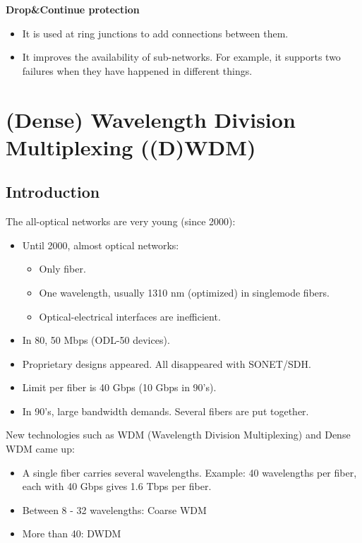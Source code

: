 \documentclass[../main.tex]{subfiles}
\begin{document}
\textbf{Drop\&Continue protection}
\begin{itemize}
	\item It is used at ring junctions to add connections between them.
	\item It improves the availability of sub-networks. For example, it supports two failures when they have happened in different things.
\end{itemize}

\section{(Dense) Wavelength Division Multiplexing ((D)WDM)}

\subsection{Introduction}

The all-optical networks are very young (since 2000):

\begin{itemize}
	\item {
		Until 2000, almost optical networks:
		\begin{itemize}
			\item Only fiber.
			\item One wavelength, usually 1310 nm (optimized) in singlemode fibers.
			\item Optical-electrical interfaces are inefficient.
		\end{itemize}
	}
	\item In 80, 50 Mbps (ODL-50 devices).
	\item Proprietary designs appeared. All disappeared with SONET/SDH.
	\item Limit per fiber is 40 Gbps (10 Gbps in 90’s).
	\item In 90’s, large bandwidth demands. Several fibers are put together.
\end{itemize}

New technologies such as WDM (Wavelength Division Multiplexing) and Dense WDM came up:

\begin{itemize}
	\item A single fiber carries several wavelengths. Example: 40 wavelengths per fiber, each with 40 Gbps gives 1.6 Tbps per fiber.
	\item Between 8 - 32 wavelengths: Coarse WDM
	\item More than 40: DWDM
\end{itemize}
\end{document}
